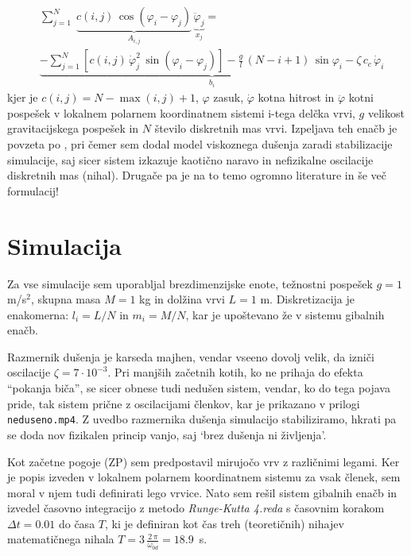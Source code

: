 \begin{align}
    &\sum_{j=1}^{N}\; \underbrace{c(i,j)\,\cos(\varphi_i-\varphi_j)}_{A_{i,j}}\, \underbrace{\ddot\varphi_j}_{x_j} = \\\nonumber
    &\underbrace{-\sum_{j=1}^{N} \left[c(i,j)\,\dot\varphi_j^2\,\sin(\varphi_i-\varphi_j) \right] - \frac{g}{l}\,(N-i+1)\,\sin\varphi_i - \zeta\,c_{c}\,\dot\varphi_i}_{b_i}
\end{align}
kjer je $c(i,j) = N - \max(i,j) + 1$, $\varphi$ zasuk, $\dot\varphi$ kotna hitrost in $\ddot\varphi$ kotni pospešek v lokalnem polarnem koordinatnem sistemi i-tega delčka vrvi, $g$ velikost gravitacijskega pospešek in $N$ število diskretnih mas vrvi. Izpeljava teh enačb je povzeta po \cite{Taylor_Pendulum_2024} \cite{Assencio_double_pendulum} \cite{N_pendulum_1} \cite{N_pendulum_2}, pri čemer sem dodal model viskoznega dušenja zaradi stabilizacije simulacije, saj sicer sistem izkazuje kaotično naravo in nefizikalne oscilacije diskretnih mas (nihal). Drugače pa je na to temo ogromno literature in še več formulacij!

\section{Simulacija}

Za vse simulacije sem uporabljal brezdimenzijske enote, težnostni pospešek $g=1$ m/s$^2$, skupna masa $M=1$ kg in dolžina vrvi $L=1$ m. Diskretizacija je enakomerna: $l_i=L/N$ in $m_i = M/N$, kar je upoštevano že v sistemu gibalnih enačb.

Razmernik dušenja je karseda majhen, vendar vseeno dovolj velik, da izniči oscilacije $\zeta=7\cdot10^{-3}$. Pri manjših začetnih kotih, ko ne prihaja do efekta ``pokanja biča'', se sicer obnese tudi nedušen sistem, vendar, ko do tega pojava pride, tak sistem prične z oscilacijami členkov, kar je prikazano v prilogi \texttt{neduseno.mp4}. Z uvedbo razmernika dušenja simulacijo stabiliziramo, hkrati pa se doda nov fizikalen princip vanjo, saj `brez dušenja ni življenja'.

Kot začetne pogoje (ZP) sem predpostavil mirujočo vrv z različnimi legami. Ker je popis izveden v lokalnem polarnem koordinatnem sistemu za vsak členek, sem moral v njem tudi definirati lego vrvice. Nato sem rešil sistem gibalnih enačb in izvedel časovno integracijo z metodo \textit{Runge-Kutta 4.reda} s časovnim korakom $\Delta t = 0.01$ do časa $T$, ki je definiran kot čas treh (teoretičnih) nihajev matematičnega nihala $T= 3\, \frac{2\,\pi}{\omega_{0d}} = 18.9$~s.

